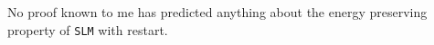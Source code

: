\noindent No proof known to me has predicted anything about the energy preserving property of \texttt{SLM} with restart. %
%

